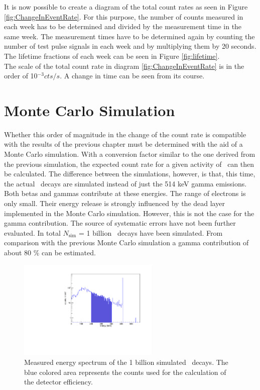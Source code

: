 \documentclass[encoding=utf8,british]{tumphthesis}
\begin{document}
It is now possible to create a diagram of the total count rates as seen in Figure \ref{fig:ChangeInEventRate}.
For this purpose, the number of counts measured in each week has to be determined and divided by the measurement time in the same week.
The measurement times have to be determined again by counting the number of test pulse signals in each week and by multiplying them by 20 seconds.
The lifetime fractions of each week can be seen in Figure \ref{fig:lifetime}.
\\

The scale of the total count rate in diagram \ref{fig:ChangeInEventRate} is in the order of 10$^{-3} \unit{cts} / \unit{s}$.
A change in time can be seen from its course.
\\

\section{Monte Carlo Simulation}
\label{sec:monteCarlo2}


Whether this order of magnitude in the change of the count rate is compatible with the results of the previous chapter must be determined with the aid of a Monte Carlo simulation.
With a conversion factor similar to the one derived from the previous simulation, the expected count rate for a given activity of \Kr\ can then be calculated.
The difference between the simulations, however, is that, this time, the actual \Kr\ decays are simulated instead of just the 514 keV gamma emissions.
\\

Both betas and gammas contribute at these energies.
The range of electrons is only small.
Their energy release is strongly influenced by the dead layer implemented in the Monte Carlo simulation.
However, this is not the case for the gamma contribution.
The source of systematic errors have not been further evaluated.
In total $N_{\mathrm{sim}}$ = 1 billion \Kr\ decays have been simulated.
From comparison with the previous Monte Carlo simulation a gamma contribution of about 80 $\%$ can be estimated.
\\

\begin{figure}[t!]
\centering
		\includegraphics[width=0.6\textwidth]{./Bilder/Sim1Phasenraum.pdf}
		\caption{
			Measured energy spectrum of the 1 billion simulated \Kr\ decays. 
			The blue colored area represents the counts used for the calculation of the detector efficiency.
		}
		\label{fig:Sim1Spektrum}
		\vspace{5mm}
\end{figure}
\end{document}
